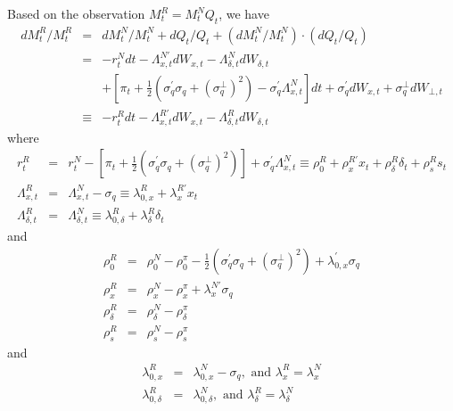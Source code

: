 \documentclass{article}
\begin{document}
Based on the observation $M_{t}^{R}=M_{t}^{N}Q_{t}$, we have%
\begin{eqnarray*}
dM_{t}^{R}/M_{t}^{R} &=&dM_{t}^{N}/M_{t}^{N}+dQ_{t}/Q_{t}+\left(
dM_{t}^{N}/M_{t}^{N}\right) \cdot \left( dQ_{t}/Q_{t}\right)  \\
&=&-r_{t}^{N}dt-\Lambda _{x,t}^{N\prime }dW_{x,t}-\Lambda _{\delta
,t}^{N}dW_{\delta ,t} \\
&&+\left[ \pi _{t}+\frac{1}{2}\left( \sigma _{q}^{\prime }\sigma _{q}+\left(
\sigma _{q}^{\bot }\right) ^{2}\right) -\sigma _{q}^{\prime }\Lambda
_{x,t}^{N}\right] dt+\sigma _{q}^{\prime }dW_{x,t}+\sigma _{q}^{\bot
}dW_{\bot ,t} \\
&\equiv &-r_{t}^{R}dt-\Lambda _{x,t}^{R\prime }dW_{x,t}-\Lambda _{\delta
,t}^{R}dW_{\delta ,t}
\end{eqnarray*}%
where 
\begin{eqnarray*}
r_{t}^{R} &=&r_{t}^{N}-\left[ \pi _{t}+\frac{1}{2}\left( \sigma _{q}^{\prime
}\sigma _{q}+\left( \sigma _{q}^{\bot }\right) ^{2}\right) \right] +\sigma
_{q}^{\prime }\Lambda _{x,t}^{N}\equiv \rho _{0}^{R}+\rho _{x}^{R\prime
}x_{t}+\rho _{\delta }^{R}\delta _{t}+\rho _{s}^{R}s_{t} \\
\Lambda _{x,t}^{R} &=&\Lambda _{x,t}^{N}-\sigma _{q}\equiv \lambda
_{0,x}^{R}+\lambda _{x}^{R\prime }x_{t} \\
\Lambda _{\delta ,t}^{R} &=&\Lambda _{\delta ,t}^{N}\equiv \lambda
_{0,\delta }^{R}+\lambda _{\delta }^{R}\delta _{t}
\end{eqnarray*}%
and%
\begin{eqnarray*}
\rho _{0}^{R} &=&\rho _{0}^{N}-\rho _{0}^{\pi }-\frac{1}{2}\left( \sigma
_{q}^{\prime }\sigma _{q}+\left( \sigma _{q}^{\bot }\right) ^{2}\right)
+\lambda _{0,x}^{\prime }\sigma _{q} \\
\rho _{x}^{R} &=&\rho _{x}^{N}-\rho _{x}^{\pi }+\lambda _{x}^{N\prime
}\sigma _{q} \\
\rho _{\delta }^{R} &=&\rho _{\delta }^{N}-\rho _{\delta }^{\pi } \\
\rho _{s}^{R} &=&\rho _{s}^{N}-\rho _{s}^{\pi }
\end{eqnarray*}%
and 
\begin{eqnarray*}
\lambda _{0,x}^{R} &=&\lambda _{0,x}^{N}-\sigma _{q},\text{ and }\lambda
_{x}^{R}=\lambda _{x}^{N} \\
\lambda _{0,\delta }^{R} &=&\lambda _{0,\delta }^{N},\text{ and }\lambda
_{\delta }^{R}=\lambda _{\delta }^{N}
\end{eqnarray*}
\end{document}
